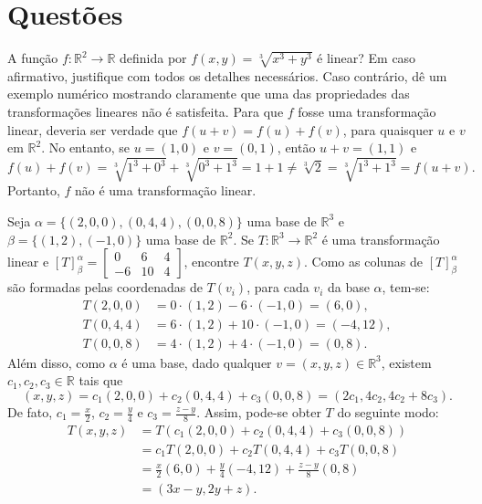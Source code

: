 \documentclass[12pt,a4paper]{article}
\newcommand*\R{\mathbb{R}}
\begin{document}
\section*{Questões}
\begin{ExerciseList}
\Exercise[title={2,0}] A função $f: \R^2 \to \R$ definida por $f(x,y) = \sqrt[3]{x^3+y^3}$ é linear? Em caso afirmativo, justifique com todos os detalhes necessários. Caso contrário, dê um exemplo numérico mostrando claramente que uma das propriedades das transformações lineares não é satisfeita.
\Answer Para que $f$ fosse uma transformação linear, deveria ser verdade que $f(u+v) = f(u)+f(v)$, para quaisquer $u$ e $v$ em $\R^2$. No entanto, se $u = (1,0)$ e $v=(0,1)$, então $u+v = (1,1)$ e
\[
f(u)+f(v)
= \sqrt[3]{1^3+0^3} + \sqrt[3]{0^3+1^3}
= 1 + 1
\neq \sqrt[3]{2}
= \sqrt[3]{1^3+1^3}
= f(u+v).
\]
Portanto, $f$ não é uma transformação linear.


\Exercise[title={2,0}] Seja
$\alpha = \{(2, 0, 0), (0, 4, 4), (0,0,8)\}$ uma base de $\R^3$ e $\beta = \{(1, 2),(-1, 0)\}$ uma base de $\R^2$. Se $T:\R^3 \to \R^2$ é uma transformação linear e $[T]_\beta^\alpha =
\begin{bmatrix}
 0 &  6 & 4\\
-6 & 10 & 4
\end{bmatrix}
$, encontre $T(x,y,z)$.
\Answer Como as colunas de $[T]_\beta^\alpha$ são formadas pelas coordenadas de $T(v_i)$, para cada $v_i$ da base $\alpha$, tem-se:
\begin{align*}
T(2,0,0) & = 0 \cdot (1,2) - 6 \cdot (-1,0) = (6,0),\\
T(0,4,4) & = 6 \cdot (1,2) +10 \cdot (-1,0) = (-4, 12),\\
T(0,0,8) & = 4 \cdot (1,2) + 4 \cdot (-1,0) = (0, 8).
\end{align*}
Além disso, como $\alpha$ é uma base, dado qualquer $v = (x,y,z) \in \R^3$, existem $c_1, c_2, c_3 \in \R$ tais que
\[
(x,y,z) = c_1 (2,0,0) + c_2(0,4,4) + c_3(0,0,8) = (2c_1, 4c_2,4c_2+8c_3).
\]
De fato, $c_1 = \frac{x}{2}$, $c_2 = \frac{y}{4}$ e $c_3 = \frac{z-y}{8}$. Assim, pode-se obter $T$ do seguinte modo:
\begin{align*}
T(x,y,z)
& = T( c_1 (2,0,0) + c_2(0,4,4) + c_3(0,0,8) )\\
& = c_1 T(2,0,0) + c_2T(0,4,4) + c_3T(0,0,8)\\
& = \frac{x}{2} (6,0)
  + \frac{y}{4}(-4, 12)
  + \frac{z-y}{8}(0, 8)\\
& = (3x-y,2y+z).
\end{align*}


\end{ExerciseList}
\end{document}
